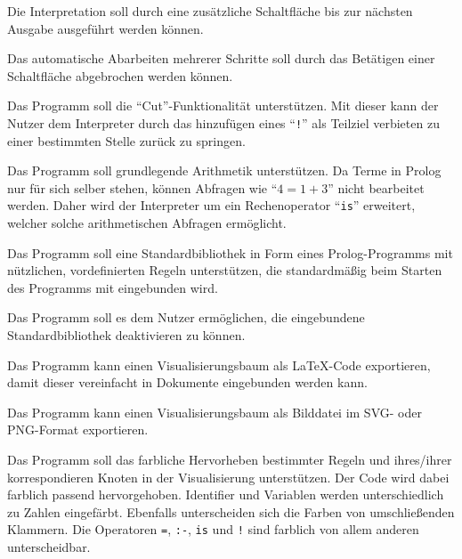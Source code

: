 \documentclass[parskip=full,11pt,twoside]{scrartcl}
\begin{document}
Die Interpretation soll durch eine zusätzliche Schaltfläche bis zur nächsten Ausgabe ausgeführt werden können.


Das automatische Abarbeiten mehrerer Schritte soll durch das Betätigen einer Schaltfläche abgebrochen werden können.


Das Programm soll die \enquote{Cut}-Funktionalität unterstützen. Mit dieser kann der Nutzer dem Interpreter durch das hinzufügen eines \enquote{\texttt{!}} als Teilziel verbieten zu einer bestimmten Stelle zurück zu springen.


Das Programm soll grundlegende Arithmetik unterstützen. Da Terme in Prolog nur für sich selber stehen, können Abfragen wie \enquote{$4 = 1 + 3$} nicht bearbeitet werden. Daher wird der Interpreter um ein Rechenoperator \enquote{\texttt{is}} erweitert, welcher solche arithmetischen Abfragen ermöglicht.


Das Programm soll eine Standardbibliothek in Form eines Prolog-Programms mit nützlichen, vordefinierten Regeln unterstützen, die standardmäßig beim Starten des Programms mit eingebunden wird.


Das Programm soll es dem Nutzer ermöglichen, die eingebundene Standardbibliothek deaktivieren zu können.


Das Programm kann einen Visualisierungsbaum als LaTeX-Code exportieren, damit dieser vereinfacht in Dokumente eingebunden werden kann.


Das Programm kann einen Visualisierungsbaum als Bilddatei im SVG- oder PNG-Format exportieren.


Das Programm soll das farbliche Hervorheben bestimmter Regeln und ihres/ihrer korrespondieren Knoten in der Visualisierung unterstützen. Der Code wird dabei farblich passend hervorgehoben. Identifier und Variablen werden unterschiedlich zu Zahlen eingefärbt. Ebenfalls unterscheiden sich die Farben von umschließenden Klammern. Die Operatoren \texttt{=}, \texttt{:-}, \texttt{is} und \texttt{!} sind farblich von allem anderen unterscheidbar.
\end{document}
